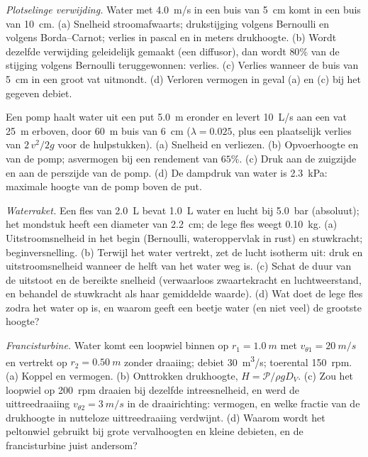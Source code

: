 \begin{exercise}[$\star\star$]\label{exo:b2:flow-balances:8}
\emph{Plotselinge verwijding.} Water met \qty{4.0}{m/s} in een buis van
\qty{5}{cm} komt in een buis van \qty{10}{cm}. (a) Snelheid stroomafwaarts;
drukstijging volgens Bernoulli en volgens Borda--Carnot; verlies in pascal
en in meters drukhoogte. (b) Wordt dezelfde verwijding geleidelijk gemaakt
(een diffusor), dan wordt $80\%$ van de stijging volgens Bernoulli
teruggewonnen: verlies. (c) Verlies wanneer de buis van \qty{5}{cm} in een
groot vat uitmondt. (d) Verloren vermogen in geval (a) en (c) bij het
gegeven debiet.
\end{exercise}

\begin{exercise}[$\star\star$]\label{exo:b2:flow-balances:9}
Een pomp haalt water uit een put \qty{5.0}{m} eronder en levert
\qty{10}{L/s} aan een vat \qty{25}{m} erboven, door \qty{60}{m} buis van
\qty{6}{cm} ($\lambda = 0.025$, plus een plaatselijk verlies van $2\,v^2/2g$
voor de hulpstukken). (a) Snelheid en verliezen. (b) Opvoerhoogte en
 van de pomp; asvermogen bij een rendement van $65\%$.
(c) Druk aan de zuigzijde en aan de perszijde van de pomp. (d) De dampdruk
van water is \qty{2.3}{kPa}: maximale hoogte van de pomp boven de put.
\end{exercise}

\begin{exercise}[$\star\star\star$]\label{exo:b2:flow-balances:10}
\emph{Waterraket.} Een fles van \qty{2.0}{L} bevat \qty{1.0}{L} water en
lucht bij \qty{5.0}{bar} (absoluut); het mondstuk heeft een diameter van
\qty{2.2}{cm}; de lege fles weegt \qty{0.10}{kg}. (a) Uitstroomsnelheid in
het begin (Bernoulli, wateroppervlak in rust) en stuwkracht;
beginversnelling. (b) Terwijl het water vertrekt, zet de lucht isotherm uit:
druk en uitstroomsnelheid wanneer de helft van het water weg is. (c) Schat
de duur van de uitstoot en de bereikte snelheid (verwaarloos zwaartekracht
en luchtweerstand, en behandel de stuwkracht als haar gemiddelde waarde).
(d) Wat doet de lege fles zodra het water op is, en waarom geeft een beetje
water (en niet veel) de grootste hoogte?
\end{exercise}

\begin{exercise}[$\star\star\star$]\label{exo:b2:flow-balances:11}
\emph{Francisturbine.} Water komt een loopwiel binnen op
$r_1 = \qty{1.0}{m}$ met $v_{\theta1} = \qty{20}{m/s}$ en vertrekt op
$r_2 = \qty{0.50}{m}$ zonder draaiing; debiet \qty{30}{m^3/s}; toerental
\qty{150}{rpm}. (a) Koppel en vermogen. (b) Onttrokken drukhoogte,
$H = \mathcal P/\rho gD_V$. (c) Zou het loopwiel op \qty{200}{rpm} draaien
bij dezelfde intreesnelheid, en werd de uittreedraaiing
$v_{\theta2} = \qty{3}{m/s}$ in de draairichting: vermogen, en welke fractie
van de drukhoogte in nutteloze uittreedraaiing verdwijnt. (d) Waarom wordt
het peltonwiel gebruikt bij grote vervalhoogten en kleine debieten, en de
francisturbine juist andersom?
\end{exercise}

